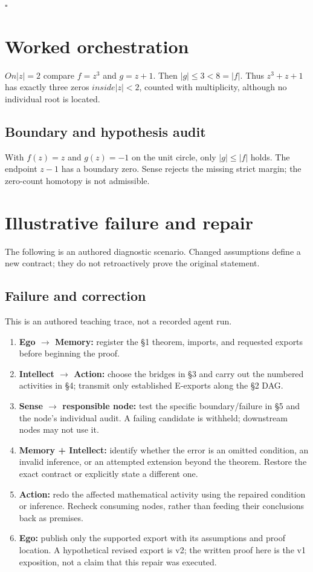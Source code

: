 \documentclass[preprint,12pt,aps,pra,showkeys,amsmath,amssymb,superscriptaddress,floatfix]{revtex4-2}
\theoremstyle{definition}
\theoremstyle{remark}
\providecommand{\tightlist}{\setlength{\itemsep}{2pt}\setlength{\parskip}{0pt}}
\begin{document}
\hfill$\square$

\section{Worked orchestration}

\(On|z|=2\) compare \(f=z^{3}\) and \(g=z+1\). Then \(|g|\le 3<8=|f|\).
Thus \(z^{3}+z+1\) has exactly three zeros \(inside|z|<2\), counted with
multiplicity, although no individual root is located.

\subsection{Boundary and hypothesis audit}

With \(f(z)=z\) and \(g(z)=-1\) on the unit circle, only \(|g|\le |f|\)
holds. The endpoint \(z-1\) has a boundary zero. Sense rejects the
missing strict margin; the zero-count homotopy is not admissible.

\section{Illustrative failure and repair}

The following is an authored diagnostic scenario. Changed assumptions
define a new contract; they do not retroactively prove the original
statement.

\subsection{Failure and correction}
This is an authored teaching trace, not a recorded agent run.

\begin{enumerate}
\def\labelenumi{\arabic{enumi}.}
\tightlist
\item
  \textbf{Ego \(\to\) Memory:} register the §1 theorem, imports, and
  requested exports before beginning the proof.
\item
  \textbf{Intellect \(\to\) Action:} choose the bridges in §3 and carry
  out the numbered activities in §4; transmit only established E-exports
  along the §2 DAG.
\item
  \textbf{Sense \(\to\) responsible node:} test the specific
  boundary/failure in §5 and the node's individual audit. A failing
  candidate is withheld; downstream nodes may not use it.
\item
  \textbf{Memory + Intellect:} identify whether the error is an omitted
  condition, an invalid inference, or an attempted extension beyond the
  theorem. Restore the exact contract or explicitly state a different
  one.
\item
  \textbf{Action:} redo the affected mathematical activity using the
  repaired condition or inference. Recheck consuming nodes, rather than
  feeding their conclusions back as premises.
\item
  \textbf{Ego:} publish only the supported export with its assumptions
  and proof location. A hypothetical revised export is v2; the written
  proof here is the v1 exposition, not a claim that this repair was
  executed.
\end{enumerate}
\end{document}
